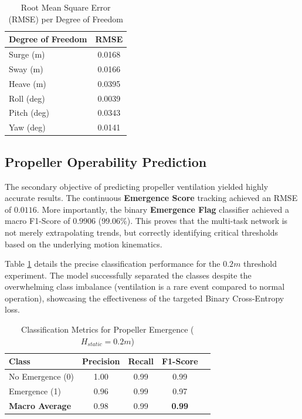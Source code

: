 \begin{table}[H]
\centering
\caption{Root Mean Square Error (RMSE) per Degree of Freedom}
\vspace{0.2cm}
\begin{tabular}{@{}lc@{}}
\toprule
\textbf{Degree of Freedom} & \textbf{RMSE} \\ \midrule
Surge (m) & 0.0168 \\
Sway (m) & 0.0166 \\
Heave (m) & 0.0395 \\
Roll (deg) & 0.0039 \\
Pitch (deg) & 0.0343 \\
Yaw (deg) & 0.0141 \\ \bottomrule
\end{tabular}
\end{table}

\subsection{Propeller Operability Prediction}
The secondary objective of predicting propeller ventilation yielded highly accurate results. The continuous \textbf{Emergence Score} tracking achieved an RMSE of $0.0116$. More importantly, the binary \textbf{Emergence Flag} classifier achieved a macro F1-Score of $0.9906$ ($99.06\%$). This proves that the multi-task network is not merely extrapolating trends, but correctly identifying critical thresholds based on the underlying motion kinematics.

Table \ref{tab:classification_metrics} details the precise classification performance for the $0.2m$ threshold experiment. The model successfully separated the classes despite the overwhelming class imbalance (ventilation is a rare event compared to normal operation), showcasing the effectiveness of the targeted Binary Cross-Entropy loss.

\begin{table}[H]
\centering
\caption{Classification Metrics for Propeller Emergence ($H_{static} = 0.2m$)}
\label{tab:classification_metrics}
\vspace{0.2cm}
\begin{tabular}{@{}lcccc@{}}
\toprule
\textbf{Class} & \textbf{Precision} & \textbf{Recall} & \textbf{F1-Score} \\ \midrule
No Emergence (0) & 1.00 & 0.99 & 0.99 \\
Emergence (1) & 0.96 & 0.99 & 0.97 \\ \midrule
\textbf{Macro Average} & 0.98 & 0.99 & \textbf{0.99} \\ \bottomrule
\end{tabular}
\end{table}

